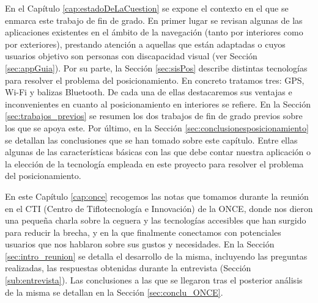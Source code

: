 En el Capítulo \ref{cap:estadoDeLaCuestion} se expone el contexto en el que se enmarca este trabajo de fin de grado. En primer lugar se revisan algunas de las aplicaciones existentes en el ámbito de la navegación (tanto por interiores como por exteriores), prestando atención a aquellas que están adaptadas o cuyos usuarios objetivo son personas con discapacidad visual (ver Sección \ref{sec:appGuia}). Por su parte, la Sección \ref{sec:sisPos} describe distintas tecnologías para resolver el problema del posicionamiento. En concreto tratamos tres: GPS, Wi-Fi y balizas Bluetooth. De cada una de ellas destacaremos sus ventajas e inconvenientes en cuanto al posicionamiento en interiores se refiere. En la Sección \ref{sec:trabajos_previos} se resumen los dos trabajos de fin de grado previos sobre los que se apoya este. Por último, en la Sección \ref{sec:conclusionesposicionamiento} se detallan las conclusiones que se han tomado sobre este capítulo. Entre ellas algunas de las características básicas con las que debe contar nuestra aplicación o la elección de la tecnología empleada en este proyecto para resolver el problema del posicionamiento. 

En este Capítulo \ref{cap:once} recogemos las notas que tomamos durante la reunión en el CTI (Centro de Tiflotecnología e Innovación) de la ONCE, donde nos dieron una pequeña charla sobre la ceguera y las tecnologías accesibles que han surgido para reducir la brecha, y en la que finalmente conectamos con potenciales usuarios que nos hablaron sobre sus gustos y necesidades. En la Sección \ref{sec:intro_reunion} se detalla el desarrollo de la misma, incluyendo las preguntas realizadas, las respuestas obtenidas durante la entrevista (Sección \ref{sub:entrevista}). Las conclusiones a las que se llegaron tras el posterior análisis de la misma se detallan en la Sección \ref{sec:conclu_ONCE}. 

